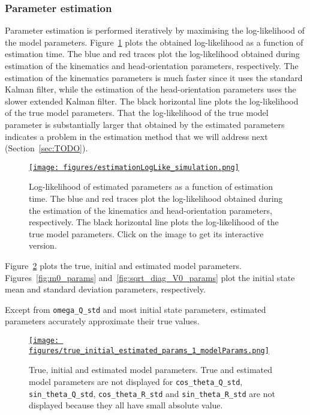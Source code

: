 \documentclass[12pt]{article}
\begin{document}
\subsubsection*{Parameter estimation}

Parameter estimation is performed iteratively by maximising the log-likelihood
of the model parameters. Figure~\ref{fig:sim_logLike} plots the obtained
log-likelihood as a function of estimation time. The blue and red traces plot the
log-likelihood obtained during estimation of the kinematics and
head-orientation parameters, respectively.
%
The estimation of the kinematics parameters is much faster since it uses the
standard Kalman filter, while the estimation of the head-orientation parameters
uses the slower extended Kalman filter. The black horizontal line plots the
log-likelihood of the true model parameters.
%
That the log-likelihood of the true model parameter is substantially larger
that obtained by the estimated parameters indicates a problem in the estimation
method that we will address next (Section~\ref{sec:TODO}).

\begin{figure}
    \centering
    \href{https://www.gatsby.ucl.ac.uk/~rapela/aman/reports/ekfForKinematicsAndHeadOrientation/figures/estimationLogLike_simulation.html}{\texttt{[image: figures/estimationLogLike\_simulation.png]}}
    \caption{Log-likelihood of estimated parameters as a function of estimation
    time. The blue and red traces plot the log-likelihood obtained during the
    estimation of the kinematics and head-orientation parameters, respectively.
    The black horizontal line plots the log-likelihood of the true model
    parameters. Click on the image to get its interactive version.}
    \label{fig:sim_logLike}
\end{figure}

Figure~\ref{fig:model_params} plots the true, initial and estimated model
parameters. Figures~\ref{fig:m0_params}
and~\ref{fig:sqrt_diag_V0_params} plot the initial
state mean and standard deviation parameters, respectively.

Except from \texttt{omega\_Q\_std} and most initial state parameters, estimated
parameters accurately approximate their true values.

\begin{figure}
    \centering
    \href{https://www.gatsby.ucl.ac.uk/~rapela/aman/reports/ekfForKinematicsAndHeadOrientation/figures/true_initial_estimated_params_1_modelParams.png}{\texttt{[image: figures/true\_initial\_estimated\_params\_1\_modelParams.png]}}

    \caption{True, initial and estimated model parameters.  True and estimated
    model parameters are not displayed for \texttt{cos\_theta\_Q\_std},
    \texttt{sin\_theta\_Q\_std}, \texttt{cos\_theta\_R\_std} and
    \texttt{sin\_theta\_R\_std} are not displayed because they all have small
    absolute value.}

    \label{fig:model_params}
\end{figure}
\end{document}
